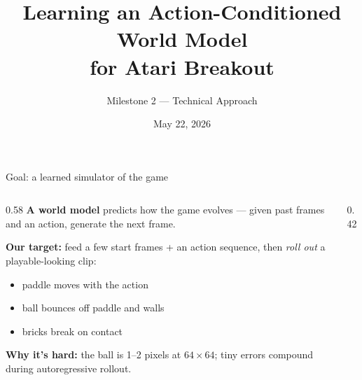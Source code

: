 \documentclass[aspectratio=169]{beamer}
\title[Atari Breakout World Model]{Learning an Action-Conditioned World Model\\for Atari Breakout}
\subtitle{Milestone 2 --- Technical Approach}
\author{}
\date{May 22, 2026}
\begin{document}
\begin{frame}
  \titlepage
\end{frame}

\begin{frame}{Goal: a learned simulator of the game}
  \begin{columns}
    \begin{column}{0.58\textwidth}
      \textbf{A world model} predicts how the game evolves --- given past
      frames and an action, generate the next frame.

      \vspace{0.5em}
      \textbf{Our target:} feed a few start frames + an action sequence, then
      \emph{roll out} a playable-looking clip:
      \begin{itemize}
        \item paddle moves with the action
        \item ball bounces off paddle and walls
        \item bricks break on contact
      \end{itemize}

      \vspace{0.5em}
      \textbf{Why it's hard:} the ball is 1--2 pixels at $64\times64$; tiny
      errors compound during autoregressive rollout.
    \end{column}
    \begin{column}{0.42\textwidth}
      \centering
    \end{column}
  \end{columns}
\end{frame}
\end{document}
